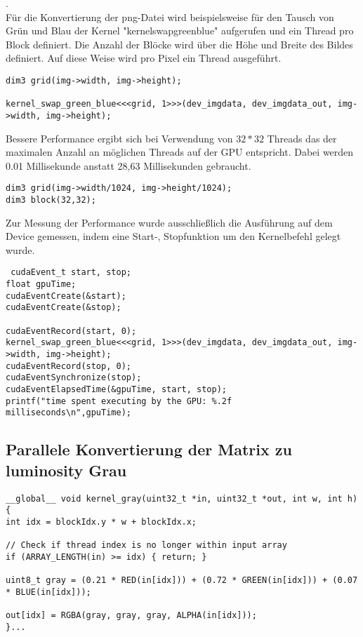 \documentclass{llncs}
\begin{document}
 \cite{NVIDIACorporation.2017}.\\

Für die Konvertierung der png-Datei wird beispielsweise für den Tausch von Grün und Blau der Kernel "kernel\textunderscore swap\textunderscore green\textunderscore blue" aufgerufen und ein Thread pro Block definiert. Die Anzahl der Blöcke wird über die Höhe und Breite des Bildes definiert. Auf diese Weise wird pro Pixel ein Thread ausgeführt.\\
 
\begin{lstlisting}
dim3 grid(img->width, img->height);

kernel_swap_green_blue<<<grid, 1>>>(dev_imgdata, dev_imgdata_out, img->width, img->height);
\end{lstlisting}

Bessere Performance ergibt sich bei Verwendung von $32*32$ Threads das der maximalen Anzahl an möglichen Threads auf der GPU entspricht. Dabei werden 0.01 Millisekunde anstatt 28,63 Millisekunden gebraucht.\\

\begin{lstlisting}
dim3 grid(img->width/1024, img->height/1024);
dim3 block(32,32);
\end{lstlisting}

Zur Messung der Performance wurde ausschließlich die Ausführung auf dem Device gemessen, indem eine Start-, Stopfunktion um den Kernelbefehl gelegt wurde.\\

\begin{lstlisting}
 cudaEvent_t start, stop;
float gpuTime;
cudaEventCreate(&start);
cudaEventCreate(&stop);

cudaEventRecord(start, 0);
kernel_swap_green_blue<<<grid, 1>>>(dev_imgdata, dev_imgdata_out, img->width, img->height);
cudaEventRecord(stop, 0);
cudaEventSynchronize(stop);
cudaEventElapsedTime(&gpuTime, start, stop);
printf("time spent executing by the GPU: %.2f milliseconds\n",gpuTime);
\end{lstlisting}

%
\subsection{Parallele Konvertierung der Matrix zu luminosity Grau}
%
\begin{lstlisting}
__global__ void kernel_gray(uint32_t *in, uint32_t *out, int w, int h){
int idx = blockIdx.y * w + blockIdx.x;
	
// Check if thread index is no longer within input array
if (ARRAY_LENGTH(in) >= idx) { return; }
	
uint8_t gray = (0.21 * RED(in[idx])) + (0.72 * GREEN(in[idx])) + (0.07 * BLUE(in[idx]));
	
out[idx] = RGBA(gray, gray, gray, ALPHA(in[idx]));
}...
\end{lstlisting}
%
\end{document}
